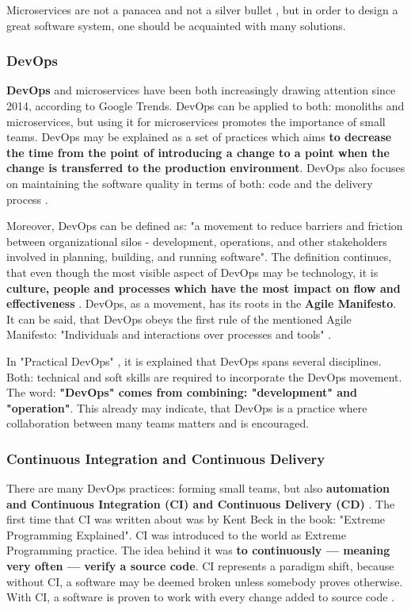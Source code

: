 Microservices are not a panacea \cite{book-cndwk} and not a silver bullet \cite{article-micro-devops}, but in order to design a great software system, one should be acquainted with many solutions.

\subsubsection{DevOps}
\textbf{DevOps} and microservices have been both increasingly drawing attention since 2014, according to Google Trends. DevOps can be applied to both: monoliths and microservices, but using it for microservices promotes the importance of small teams. DevOps may be explained as a set of practices which aims \textbf{to decrease the time from the point of introducing a change to a point when the change is transferred to the production environment}. DevOps also focuses on maintaining the software quality in terms of both: code and the delivery process \cite{article-micro-devops}.

Moreover, DevOps can be defined as: "a movement to reduce barriers and friction between organizational silos - development, operations, and other stakeholders involved in planning, building, and running software". The definition continues, that even though the most visible aspect of DevOps may be technology, it is \textbf{culture, people and processes which have the most impact on flow and effectiveness} \cite{book-iac}. DevOps, as a movement, has its roots in the \textbf{Agile Manifesto}. It can be said, that DevOps obeys the first rule of the mentioned Agile Manifesto: "Individuals and interactions over processes and tools" \cite{book-pr-devops}.

In "Practical DevOps" \cite{book-pr-devops}, it is explained that DevOps spans several disciplines. Both: technical and soft skills are required to incorporate the DevOps movement. The word: \textbf{"DevOps" comes from combining: "development" and "operation"}. This already may indicate, that DevOps is a practice where collaboration between many teams matters and is encouraged.

\subsubsection{Continuous Integration and Continuous Delivery}
There are many DevOps practices: forming small teams, but also \textbf{automation and Continuous Integration (CI) and Continuous Delivery (CD)} \cite{article-micro-devops, book-pr-devops}. The first time that CI was written about was by Kent Beck in the book: "Extreme Programming Explained". CI was introduced to the world as Extreme Programming practice. The idea behind it was \textbf{to continuously --- meaning very often --- verify a source code}. CI represents a paradigm shift, because without CI, a software may be deemed broken unless somebody proves otherwise. With CI, a software is proven to work with every change added to source code \cite{book-cicd}.

